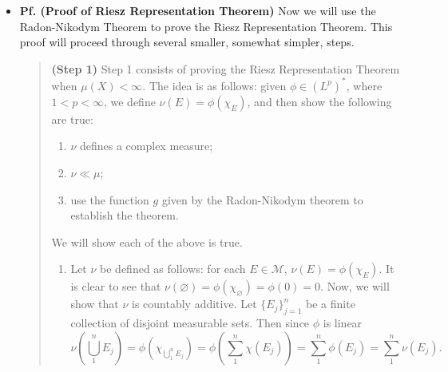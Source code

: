 \documentclass{article}
\begin{document}
\begin{itemize}
\begin{solutions}
		\begin{align}
			\begin{split}
				\infty &> \int_{X}\abs{g}^{q}\;d\mu \\
				&\geq \int_{X_{j_{0}}}\abs{g}^{q}\;d\mu \\
				&\geq j_{0}^{-q}\cdot \mu(X_{j_{0}}) = \infty, 
			\end{split}
		\end{align}
		which is a contradiction. Hence, for each $j$, $\mu(X_{j}) < \infty$, proving $\sigma$-finiteness. To see the importance of $q < \infty$, let $X$ be a non-$\sigma$-finite space, and $g$ be a nonzero constant function. Then clearly $g \in L^{q}$, but $\{g \neq 0\} = X$ is not $\sigma$-finite by hypothesis. 
	\end{solutions} 
	\item \textbf{Pf. (Proof of Riesz Representation Theorem)} Now we will use the Radon-Nikodym Theorem to prove the Riesz Representation Theorem. This proof will proceed through several smaller, somewhat simpler, steps. 
	\begin{quote}
		\textbf{(Step 1)} Step 1 consists of proving the Riesz Representation Theorem when $\mu(X) < \infty$. The idea is as follows: given $\phi \in (L^{p})^{\ast}$, where $1 < p < \infty$, we define $\nu(E) = \phi(\chi_{E})$, and then show the following are true: 
		\begin{enumerate}[itemsep =-2pt,label = (\arabic{*})]
			\item $\nu$ defines a complex measure; 
			\item  $\nu \ll \mu$; 
			\item use the function $g$ given by the Radon-Nikodym theorem to establish the theorem. 
		\end{enumerate} 
		\begin{solutions}
			We will show each of the above is true. \vspace{-0.15cm}
			\begin{enumerate}[itemsep =-2pt,label = (\arabic{*})]
				\item Let $\nu$ be defined as follows: for each $E \in \mathscr{M}$, $\nu(E) =\phi(\chi_{E})$. It is clear to see that $\nu(\varnothing) = \phi(\chi_{\varnothing}) =\phi(0) = 0$. Now, we will show that $\nu$ is countably additive. Let $\{E_{j}\}_{j = 1}^{n}$ be a finite collection of disjoint measurable sets. Then since $\phi$ is linear 
				\begin{equation}
					\nu\left(\bigcup_{1}^{n}E_{j}\right) = \phi\left(\chi_{\bigcup_{1}^{n}E_{j}}\right) = \phi\left(\sum_{1}^{n}\chi(E_{j})\right) = \sum_{1}^{n}\phi(E_{j}) = \sum_{1}^{n}\nu(E_{j}). 

\end{equation}
\end{enumerate}
\end{solutions}
\end{quote}
\end{itemize}
\end{document}
